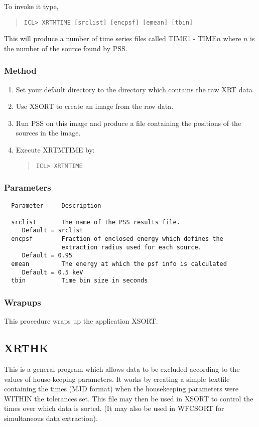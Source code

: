 \documentclass{book}
\renewcommand{\_}{{\tt\char'137}}     %
\begin{document}
To invoke it type,
\begin{quote}\begin{verbatim}
ICL> XRTMTIME [srclist] [encpsf] [emean] [tbin]
\end{verbatim}\end{quote}
This will produce a number of time series files called TIME1 -
TIME$n$ where $n$ is the number of the source found by
PSS.

\subsubsection{Method}

\begin{enumerate}
\item Set your default directory to the directory which contains
the raw XRT data
\item Use XSORT to create an image from the raw data.
\item Run PSS on this image and produce a file containing the positions
of the sources in the image.
\item Execute XRTMTIME by:
\begin{quote}\begin{verbatim}
ICL> XRTMTIME
\end{verbatim}\end{quote}
\end{enumerate}
\subsubsection{Parameters}
\begin{verbatim}
  Parameter     Description

  srclist       The name of the PSS results file.
     Default = srclist
  encpsf        Fraction of enclosed energy which defines the
                extraction radius used for each source.
     Default = 0.95
  emean         The energy at which the psf info is calculated
     Default = 0.5 keV
  tbin          Time bin size in seconds

\end{verbatim}\subsubsection{Wrapups}
This procedure wraps up the application XSORT.

\subsection{XRTHK}
This is a general program which allows data to be excluded
according to the values of house-keeping parameters. It works
by creating a simple textfile containing the times (MJD format) when
the housekeeping parameters were WITHIN the tolerances set.
This file may then be used in XSORT to control the times
over which data is sorted. (It may also be used in WFCSORT
for simultaneous data extraction).
\end{document}
